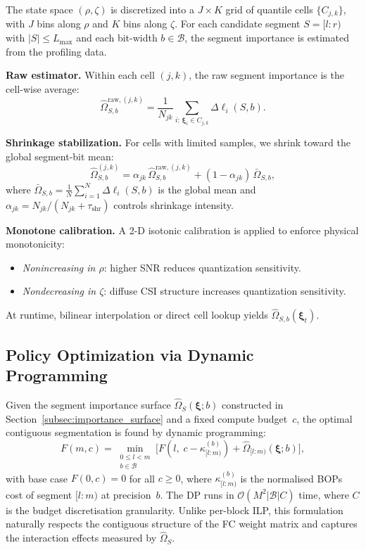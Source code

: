 \documentclass[conference]{IEEEtran}
\begin{document}
The state space $(\rho,\zeta)$ is discretized into a $J\times K$ grid of quantile cells $\{C_{j,k}\}$, with $J$ bins along $\rho$ and $K$ bins along $\zeta$.
For each candidate segment $S=[l{:}r)$ with $|S|\le L_{\max}$ and each bit-width $b\in\mathcal{B}$, the segment importance is estimated from the profiling data.

\textbf{Raw estimator.}
Within each cell $(j,k)$, the raw segment importance is the cell-wise average:
\begin{equation}
\widehat{\Omega}_{S,b}^{\mathrm{raw},(j,k)} = \frac{1}{N_{jk}} \sum_{i:\,\boldsymbol{\xi}_i\in C_{j,k}} \Delta\ell_i(S,b).
\label{eq:raw_omega}
\end{equation}

\textbf{Shrinkage stabilization.}
For cells with limited samples, we shrink toward the global segment-bit mean:
\begin{equation}
\widehat{\Omega}_{S,b}^{(j,k)} = \alpha_{jk}\,\widehat{\Omega}_{S,b}^{\mathrm{raw},(j,k)} + (1-\alpha_{jk})\,\bar{\Omega}_{S,b},
\label{eq:shrinkage}
\end{equation}
where $\bar{\Omega}_{S,b} = \frac{1}{N}\sum_{i=1}^{N}\Delta\ell_i(S,b)$ is the global mean and $\alpha_{jk}=N_{jk}/(N_{jk}+\tau_{\mathrm{shr}})$ controls shrinkage intensity.

\textbf{Monotone calibration.}
A 2-D isotonic calibration is applied to enforce physical monotonicity:
\begin{itemize}
\item \emph{Nonincreasing in $\rho$}: higher SNR reduces quantization sensitivity.
\item \emph{Nondecreasing in $\zeta$}: diffuse CSI structure increases quantization sensitivity.
\end{itemize}
At runtime, bilinear interpolation or direct cell lookup yields $\widehat{\Omega}_{S,b}(\boldsymbol{\xi}_t)$.

\subsection{Policy Optimization via Dynamic Programming}
\label{subsec:policy_opt}

Given the segment importance surface $\widehat{\Omega}_S(\boldsymbol{\xi}; b)$ constructed in Section~\ref{subsec:importance_surface} and a fixed compute budget~$c$, the optimal contiguous segmentation is found by dynamic programming:
\begin{equation}
F(m,c) = \min_{\substack{0\le l < m \\ b\in\mathcal{B}}}
\Big[F(l,\;c{-}\kappa_{[l:m)}^{(b)}) + \widehat{\Omega}_{[l:m)}(\boldsymbol{\xi};b)\Big],
\label{eq:dp}
\end{equation}
with base case $F(0,c)=0$ for all $c\ge 0$, where $\kappa_{[l:m)}^{(b)}$ is the normalised BOPs cost of segment $[l{:}m)$ at precision~$b$.
The DP runs in $\mathcal{O}(M^2 |\mathcal{B}| C)$ time, where $C$ is the budget discretisation granularity.
Unlike per-block ILP, this formulation naturally respects the contiguous structure of the FC weight matrix and captures the interaction effects measured by $\widehat{\Omega}_S$.
\end{document}
